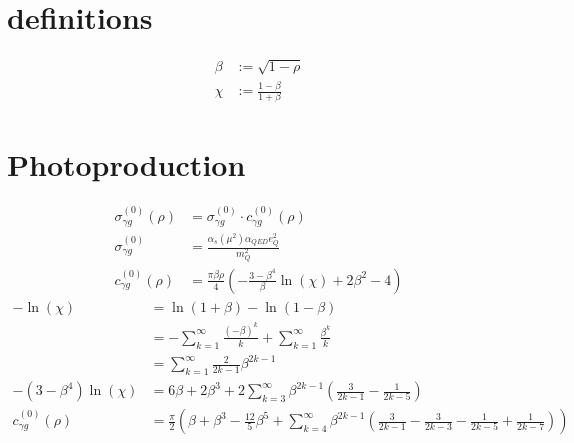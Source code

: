 \documentclass[
  ngerman,		%
  a4paper,		%
  11pt,			%
  DIV=12,		%
  parskip=half  	%
]{scrartcl}
\begin{document}
\section{definitions}
\begin{align}
\beta &:= \sqrt{1-\rho}\\
\chi &:= \frac{1-\beta}{1+\beta}
\end{align}

\section{Photoproduction}
\begin{align}
\sigma_{\gamma g}^{(0)}(\rho) &= \sigma^{(0)}_{\gamma g}\cdot c^{(0)}_{\gamma g}(\rho)\\
\sigma^{(0)}_{\gamma g} &= \frac{\alpha_s(\mu^2)\alpha_{QED} e_Q^2}{m_Q^2}\\
c^{(0)}_{\gamma g}(\rho) &= \frac{\pi\beta\rho}{4}\left(-\frac{3-\beta^4}{\beta}\ln(\chi)+ 2\beta^2 - 4\right)
\end{align}
\begin{align}
-\ln(\chi) &=\ln(1+\beta)-\ln(1-\beta)\\
 &=-\sum_{k=1}^\infty \frac{(-\beta)^k}{k} + \sum_{k=1}^\infty \frac{\beta^k}{k}\\
 &= \sum_{k=1}^\infty\frac{2}{2k-1}\beta^{2k-1}\\
-(3-\beta^4)\ln(\chi) &= 6\beta +2\beta^3 + 2\sum_{k=3}^\infty \beta^{2k-1}\left(\frac 3 {2k-1} - \frac 1 {2k-5}\right)\\
c^{(0)}_{\gamma g}(\rho) &= \frac \pi 2 \left(\beta + \beta^3 - \frac{12}5\beta^5 + \sum_{k=4}^\infty \beta^{2k-1}\left(\frac 3 {2k-1} - \frac 3 {2k-3} - \frac 1 {2k-5} + \frac 1 {2k-7}\right) \right)
\end{align}
\end{document}
